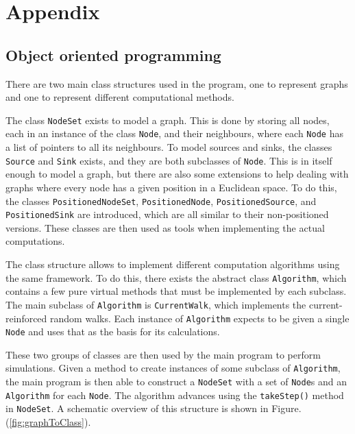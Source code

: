 \section{Appendix}
\label{sec:appendix}

\subsection{Object oriented programming}

There are two main class structures used in the program, one to represent graphs and one to represent different computational methods.

The class \texttt{NodeSet} exists to model a graph. This is done by storing all nodes, each in an instance of the class \texttt{Node}, and their neighbours, where each \texttt{Node} has a list of pointers to all its neighbours. To model sources and sinks, the classes \texttt{Source} and \texttt{Sink} exists, and they are both subclasses of \texttt{Node}. This is in itself enough to model a graph, but there are also some extensions to help dealing with graphs where every node has a given position in a Euclidean space. To do this, the classes \texttt{PositionedNodeSet}, \texttt{PositionedNode}, \texttt{PositionedSource}, and \texttt{PositionedSink} are introduced, which are all similar to their non-positioned versions. These classes are then used as tools when implementing the actual computations.

The class structure allows to implement different computation algorithms using the same framework. To do this, there exists the abstract class \texttt{Algorithm}, which contains a few pure virtual methods that must be implemented by each subclass. The main subclass of \texttt{Algorithm} is \texttt{CurrentWalk}, which implements the current-reinforced random walks. Each instance of \texttt{Algorithm} expects to be given a single \texttt{Node} and uses that as the basis for its calculations.

These two groups of classes are then used by the main program to perform simulations. Given a method to create instances of some subclass of \texttt{Algorithm}, the main program is then able to construct a \texttt{NodeSet} with a set of \texttt{Node}s and an \texttt{Algorithm} for each \texttt{Node}. The algorithm advances using the \texttt{takeStep()} method in \texttt{NodeSet}. A schematic overview of this structure is shown in Figure. (\ref{fig:graphToClass}).

